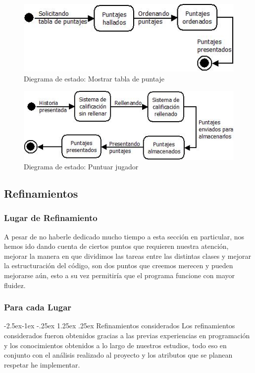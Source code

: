 \documentclass[12pt]{article}
\makeatletter
\renewcommand\paragraph{\@startsection{paragraph}{4}{\z@}%
	{-2.5ex\@plus -1ex \@minus -.25ex}%
	{1.25ex \@plus .25ex}%
	{\normalfont\normalsize\bfseries}}
\makeatother
\begin{document}
\begin{figure}[H]
	\centering
	\includegraphics[scale=1]{imgs/DiagramaEstado5.png}
	\caption{Diegrama de estado: Mostrar tabla de puntaje}
\end{figure}

\begin{figure}[H]
	\centering
	\includegraphics[scale=1]{imgs/DiagramaEstado6.png}
	\caption{Diegrama de estado: Puntuar jugador}
\end{figure}
\subsection{Refinamientos}
\subsubsection{Lugar de Refinamiento}
A pesar de no haberle dedicado mucho tiempo a esta sección en particular, nos hemos ido dando cuenta de ciertos puntos que requieren nuestra atención, mejorar la manera en que dividimos las tareas entre las distintas clases y mejorar la estructuración del código, son dos puntos que creemos merecen y pueden mejorarse aún, esto a su vez permitiría que el programa funcione con mayor fluidez.
\subsubsection{Para cada Lugar}
\paragraph{Refinamientos considerados}
Los refinamientos considerados fueron obtenidos gracias a las previas experiencias en programación y los conocimientos obtenidos a lo largo de nuestros estudios, todo eso en conjunto con el análisis realizado al proyecto y los atributos que se planean respetar he implementar.
\end{document}
